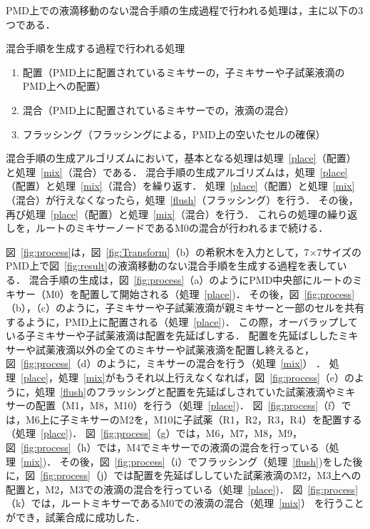 \newpage
PMD上での液滴移動のない混合手順の生成過程で行われる処理は，主に以下の3つである．
\begin{itembox}[l]{混合手順を生成する過程で行われる処理}
\begin{enumerate}
    \item 配置（PMD上に配置されているミキサーの，子ミキサーや子試薬液滴のPMD上への配置）\label{place}
    \item 混合（PMD上に配置されているミキサーでの，液滴の混合）\label{mix}
    \item フラッシング（フラッシングによる，PMD上の空いたセルの確保）\label{flush}
\end{enumerate}
\end{itembox}

混合手順の生成アルゴリズムにおいて，基本となる処理は処理~\ref{place}（配置）と処理~\ref{mix}（混合）である．
混合手順の生成アルゴリズムは，処理~\ref{place}（配置）と処理~\ref{mix}（混合）を繰り返す．
処理~\ref{place}（配置）と処理~\ref{mix}（混合）が行えなくなったら，処理~\ref{flush}（フラッシング）を行う．
その後，再び処理~\ref{place}（配置）と処理~\ref{mix}（混合）を行う．
これらの処理の繰り返しを，ルートのミキサーノードであるM0の混合が行われるまで続ける．

\newpage

図~\ref{fig:process}は，図~\ref{fig:Transform}（b）の希釈木を入力として，7$\times$7サイズのPMD上で図~\ref{fig:result}の液滴移動のない混合手順を生成する過程を表している．
混合手順の生成は，図~\ref{fig:process}（a）のようにPMD中央部にルートのミキサー（M0）を配置して開始される（処理~\ref{place})．
その後，図~\ref{fig:process}（b），（c）のように，子ミキサーや子試薬液滴が親ミキサーと一部のセルを共有するように，PMD上に配置される（処理~\ref{place})．
この際，オーバラップしている子ミキサーや子試薬液滴は配置を先延ばしする． 配置を先延ばししたミキサーや試薬液滴以外の全てのミキサーや試薬液滴を配置し終えると，図~\ref{fig:process}（d）のように，ミキサーの混合を行う（処理~\ref{mix}） ．
処理~\ref{place}，処理~\ref{mix}がもうそれ以上行えなくなれば，図~\ref{fig:process}（e）のように，処理~\ref{flush}のフラッシングと配置を先延ばしされていた試薬液滴やミキサーの配置（M1，M8，M10）を行う（処理~\ref{place})．
図~\ref{fig:process}（f）では，M6上に子ミキサーのM2を，M10に子試薬（R1，R2，R3，R4）を配置する（処理~\ref{place})．
図~\ref{fig:process}（g）では，M6，M7，M8，M9，図~\ref{fig:process}（h）では，M4でミキサーでの液滴の混合を行っている（処理~\ref{mix})．
その後，図~\ref{fig:process}（i）でフラッシング（処理~\ref{flush})をした後に，図~\ref{fig:process}（j）では配置を先延ばししていた試薬液滴のM2，M3上への配置と，M2，M3での液滴の混合を行っている（処理~\ref{place})．
図~\ref{fig:process}（k）では，ルートミキサーであるM0での液滴の混合（処理~\ref{mix}） を行うことができ，試薬合成に成功した．

